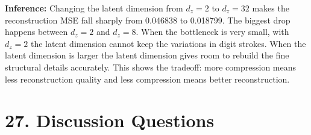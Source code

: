 \documentclass[10pt]{article}
\begin{document}
\textbf{Inference:} Changing the latent dimension from $d_z = 2$ to $d_z = 32$ makes the reconstruction MSE fall sharply from 0.046838 to 0.018799. The biggest drop happens between $d_z = 2$ and $d_z = 8$. When the bottleneck is very small, with $d_z = 2$ the latent dimension cannot keep the variations in digit strokes. When the latent dimension is larger the latent dimension gives room to rebuild the fine structural details accurately. This shows the tradeoff: more compression means less reconstruction quality and less compression means better reconstruction.


\section*{27. Discussion Questions}
\end{document}

